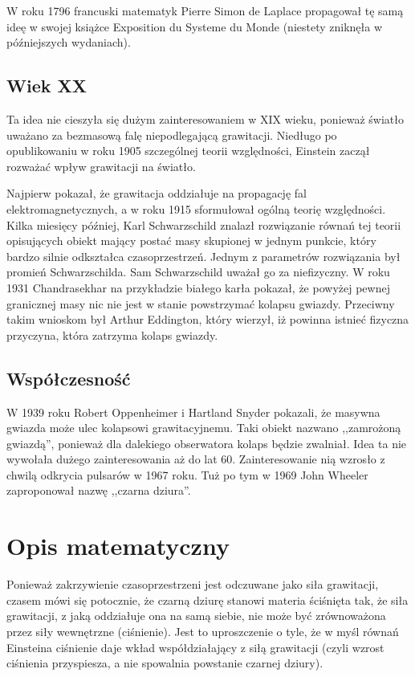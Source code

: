 \documentclass[12pt]{article}
\begin{document}
W roku 1796 francuski matematyk Pierre Simon de Laplace propagowa\l{} t\k{e} sam\k{a} ide\k{e} w swojej ksi\k{a}\.{z}ce Exposition du Systeme du Monde (niestety znikn\k{e}\l{}a w p\'{o}\'{z}niejszych wydaniach).
\subsection{Wiek XX}
Ta idea nie cieszy\l{}a si\k{e} du\.{z}ym zainteresowaniem w XIX wieku, poniewa\.{z} \'{s}wiat\l{}o uwa\.{z}ano za bezmasow\k{a} fal\k{e} niepodlegaj\k{a}c\k{a} grawitacji. Nied\l{}ugo po opublikowaniu w roku 1905 szczeg\'{o}lnej teorii wzgl\k{e}dno\'{s}ci, Einstein zacz\k{a}\l{} rozwa\.{z}a\'{c} wp\l{}yw grawitacji na \'{s}wiat\l{}o.

Najpierw pokaza\l{}, \.{z}e grawitacja oddzia\l{}uje na propagacj\k{e} fal \newline elektromagnetycznych, a w roku 1915 sformu\l{}owa\l{} og\'{o}ln\k{a} teori\k{e} wzgl\k{e}dno\'{s}ci. Kilka miesi\k{e}cy p\'{o}\'{z}niej, Karl Schwarzschild znalaz\l{} rozwi\k{a}zanie r\'{o}wna\'{n} tej teorii opisuj\k{a}cych obiekt maj\k{a}cy posta\'{c} masy skupionej w jednym punkcie, kt\'{o}ry bardzo silnie odkszta\l{}ca czasoprzestrze\'{n}. Jednym z parametr\'{o}w \newline rozwi\k{a}zania by\l{} promie\'{n} Schwarzschilda. Sam Schwarzschild uwa\.{z}a\l{} go za niefizyczny. W roku 1931 Chandrasekhar na przyk\l{}adzie bia\l{}ego kar\l{}a pokaza\l{}, \.{z}e powy\.{z}ej pewnej granicznej masy nic nie jest w stanie powstrzyma\'{c} kolapsu gwiazdy. Przeciwny takim wnioskom by\l{} Arthur Eddington, kt\'{o}ry wierzy\l{}, i\.{z} powinna istnie\'{c} fizyczna przyczyna, kt\'{o}ra zatrzyma kolaps gwiazdy.
\subsection{Wsp\'{o}\l{}czesno\'{s}\'{c}}
W 1939 roku Robert Oppenheimer i Hartland Snyder pokazali, \.{z}e masywna gwiazda mo\.{z}e ulec kolapsowi grawitacyjnemu. Taki obiekt nazwano ,,zamro\.{z}on\k{a} gwiazd\k{a}\textquotedblright{}, poniewa\.{z} dla dalekiego obserwatora kolaps b\k{e}dzie zwalnia\l{}. Idea ta nie wywo\l{}a\l{}a du\.{z}ego zainteresowania a\.{z} do lat 60. Zainteresowanie ni\k{a} wzros\l{}o z chwil\k{a} odkrycia pulsar\'{o}w w 1967 roku. Tu\.{z} po tym w 1969 John Wheeler zaproponowa\l{} nazw\k{e} ,,czarna dziura\textquotedblright{}.
\newpage
\section{Opis matematyczny}
Poniewa\.{z} zakrzywienie czasoprzestrzeni jest odczuwane jako si\l{}a grawitacji, czasem m\'{o}wi si\k{e} potocznie, \.{z}e czarn\k{a} dziur\k{e} stanowi materia \'{s}ci\'{s}ni\k{e}ta tak, \.{z}e si\l{}a grawitacji, z jak\k{a} oddzia\l{}uje ona na sam\k{a} siebie, nie mo\.{z}e by\'{c} zr\'{o}wnowa\.{z}ona przez si\l{}y wewn\k{e}trzne (ci\'{s}nienie). Jest to uproszczenie o tyle, \.{z}e w my\'{s}l r\'{o}wna\'{n} Einsteina ci\'{s}nienie daje wk\l{}ad wsp\'{o}\l{}dzia\l{}aj\k{a}cy z si\l{}\k{a} grawitacji (czyli wzrost ci\'{s}nienia przyspiesza, a nie spowalnia powstanie czarnej dziury).
\end{document}
